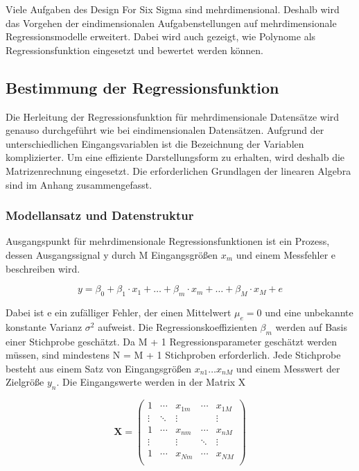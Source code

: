 \noindent Viele Aufgaben des Design For Six Sigma sind mehrdimensional. Deshalb wird das Vorgehen der eindimensionalen Aufgabenstellungen auf mehrdimensionale Regressionsmodelle erweitert. Dabei wird auch gezeigt, wie Polynome als Regressionsfunktion eingesetzt und bewertet werden k\"{o}nnen.

\subsection{Bestimmung der Regressionsfunktion}

\noindent Die Herleitung der Regressionsfunktion f\"{u}r mehrdimensionale Datens\"{a}tze wird genauso durchgef\"{u}hrt wie bei eindimensionalen Datens\"{a}tzen. Aufgrund der unterschiedlichen Eingangsvariablen ist die Bezeichnung der Variablen komplizierter. Um eine effiziente Darstellungsform zu erhalten, wird deshalb die Matrizenrechnung eingesetzt. Die erforderlichen Grundlagen der linearen Algebra sind im Anhang zusammengefasst.

\subsubsection{Modellansatz und Datenstruktur}

\noindent Ausgangspunkt f\"{u}r mehrdimensionale Regressionsfunktionen ist ein Prozess, dessen Ausgangssignal y durch M Eingangsgr\"{o}{\ss}en $x_{m}$ und einem Messfehler e beschreiben wird.

\begin{equation}\label{eq:thirteenone}
y=\beta _{0} +\beta _{1} \cdot x_{1} +\ldots +\beta _{m} \cdot x_{m} +\ldots +\beta _{M} \cdot x_{M} +e
\end{equation}

\noindent Dabei ist e ein zuf\"{a}lliger Fehler, der einen Mittelwert $\mu_{e} = 0$ und eine unbekannte konstante Varianz $\sigma^{2}$ aufweist. Die Regressionskoeffizienten $\beta_{m}$ werden auf Basis einer Stichprobe gesch\"{a}tzt. Da M + 1 Regressionsparameter gesch\"{a}tzt werden m\"{u}ssen, sind mindestens N = M + 1 Stichproben erforderlich. Jede Stichprobe besteht aus einem Satz von Eingangsgr\"{o}{\ss}en $x_{n1} \dots x_{nM}$ und einem Messwert der Zielgr\"{o}{\ss}e $y_{n}$. Die Eingangswerte werden in der Matrix X

\begin{equation}\label{eq:thirteentwo}
\mathbf{X}=
\begin{pmatrix}
1 & \cdots & x_{1m} & \cdots & x_{1M} \\
\vdots & \ddots & \vdots & & \vdots \\
1 & \cdots & x_{nm} & \cdots & x_{nM}\\
\vdots & & \vdots & \ddots & \vdots\\
1 & \cdots & x_{Nm} & \cdots & x_{NM}\\
\end{pmatrix}
\end{equation}


